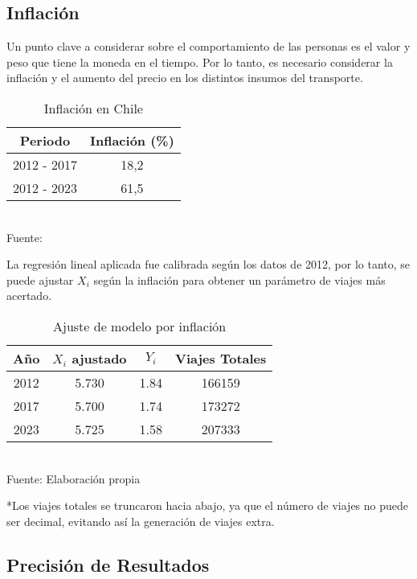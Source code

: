 \documentclass[12pt]{article} %
\begin{document}
\subsection{Inflación}

Un punto clave a considerar sobre el comportamiento de las personas es el valor y peso que tiene la moneda en el tiempo. Por lo tanto, es necesario considerar la inflación y el aumento del precio en los distintos insumos del transporte.

\begin{table}[H]
    \centering
    \caption{Inflación en Chile}
    \vspace{0.2cm}
    \begin{tabular}{|c|c|}
        \hline
        Periodo & Inflación (\%) \\
        \hline
        2012 - 2017 & 18,2 \\
        2012 - 2023 & 61,5 \\
        \hline
    \end{tabular}
    \vspace{0.2cm}
    \\Fuente: \textbf{\cite{ipc}}
\end{table}

La regresión lineal aplicada fue calibrada según los datos de 2012, por lo tanto, se puede ajustar $X_i$ según la inflación para obtener un parámetro de viajes más acertado.

\begin{table}[H]
    \centering
    \caption{Ajuste de modelo por inflación}
    \vspace{0.2cm}
    \begin{tabular}{|c|c|c|c|}
        \hline
        Año & $X_i$ ajustado & $Y_i$ & Viajes Totales \\
        \hline
        2012 & 5.730 & 1.84 & 166159 \\
        2017 & 5.700 & 1.74 & 173272 \\
        2023 & 5.725 & 1.58 & 207333 \\
        \hline
    \end{tabular}
    \vspace{0.2cm}
    \\Fuente: Elaboración propia
\end{table}

*Los viajes totales se truncaron hacia abajo, ya que el número de viajes no puede ser decimal, evitando así la generación de viajes extra.

\subsection{Precisión de Resultados}
\end{document}
